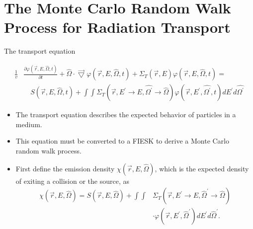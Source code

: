\documentclass{beamer}
\begin{document}
\section{The Monte Carlo Random Walk Process for Radiation Transport}
\begin{frame}{The transport equation}

\begin{equation*}
  \begin{split}
    \frac{1}{v}&\frac{\partial \varphi(\vec{r},E,\hat{\Omega},t)}{\partial t} +
    \hat{\Omega} \cdot \vec{\bigtriangledown} \varphi(\vec{r},E,\hat{\Omega},t)
    + \Sigma_T(\vec{r},E) \varphi(\vec{r},E,\hat{\Omega},t) = \\
    & \quad S(\vec{r},E,\hat{\Omega},t) +
    \int\int \Sigma_T(\vec{r},E^{'} \to E,\hat{\Omega^{'}} \to \hat{\Omega})
    \varphi(\vec{r},E^{'},\hat{\Omega^{'}},t) dE^{'}d\hat{\Omega^{'}} \nonumber
  \end{split}
\end{equation*}

  \begin{itemize}
    \item The transport equation describes the expected behavior of particles
      in a medium.
    \item This equation must be converted to a FIESK to derive a Monte Carlo
      random walk process.
    \item First define the emission density $\chi(\vec{r},E,\hat{\Omega})$, 
      which is the expected density of exiting a collision or the source, as
      \newline
      \begin{align}
        \chi(\vec{r},E,\hat{\Omega}) = S(\vec{r},E,\hat{\Omega}) +
        \int\int &\Sigma_T(\vec{r},E^{'} \to E,\hat{\Omega}^{'} \to \hat{\Omega})
        \nonumber \\
        & \cdot \varphi(\vec{r},E^{'},\hat{\Omega}^{'}) dE^{'}d\hat{\Omega}^{'}.
        \nonumber
      \end{align}
  \end{itemize}

\end{frame}
\end{document}
